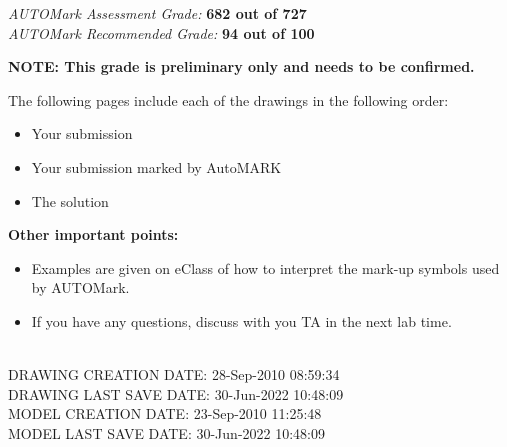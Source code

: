 \documentclass{article}
\begin{document}
\begin{center}
 \large \emph {{AUTOMark Assessment Grade:}}
 \large \textbf{682 out of 727}\\[0.5 cm] %
 \large \emph {{AUTOMark Recommended Grade:}}
 \large \textbf{94 out of 100}\\[0.5 cm] %
\end{center}
\vspace{1.0\baselineskip} %
\begin{flushleft}
\textbf{NOTE: This grade is preliminary only and needs to be confirmed.}\\[1.0 cm] %
\end{flushleft}
The following pages include each of the drawings in the following order:
\begin{itemize}
\itemsep0em %
	\item Your submission 
	\item Your submission marked by AutoMARK
	\item The solution
\end{itemize}
%
\textbf{Other important points:}
\begin{itemize}
\itemsep0em %
	\item Examples are given on eClass of how to interpret the mark-up symbols used by AUTOMark.
	\item If you have any questions, discuss with you TA in the next lab time.
\end{itemize}

\begin{flushleft} \large
\\[0.5cm]
DRAWING CREATION DATE: {28-Sep-2010 08:59:34}\\
DRAWING LAST SAVE DATE: {30-Jun-2022 10:48:09}\\
MODEL CREATION DATE: {23-Sep-2010 11:25:48}\\
MODEL LAST SAVE DATE: {30-Jun-2022 10:48:09}\\
\end{flushleft}
\end{document}

